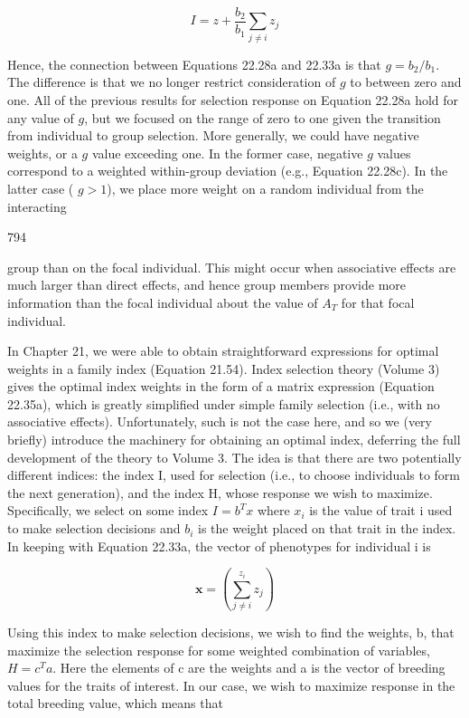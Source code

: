 \documentclass{article}
\begin{document}
\begin{equation}
I=z+\frac{b_{2}}{b_{1}}\sum_{j\neq i}z_{j}
\tag{22.33b}
\label{eq:22_33b}
\end{equation}

Hence, the connection between Equations 22.28a and 22.33a is that  $ g = b_2/b_1 $. The difference is that we no longer restrict consideration of  $ g $ to between zero and one. All of the previous results for selection response on Equation 22.28a hold for any value of  $ g $, but we focused on the range of zero to one given the transition from individual to group selection. More generally, we could have negative weights, or a  $ g $ value exceeding one. In the former case, negative  $ g $ values correspond to a weighted within-group deviation (e.g., Equation 22.28c). In the latter case ( $ g > 1 $), we place more weight on a random individual from the interacting

794

group than on the focal individual. This might occur when associative effects are much larger than direct effects, and hence group members provide more information than the focal individual about the value of  $ A_{T} $ for that focal individual.

In Chapter 21, we were able to obtain straightforward expressions for optimal weights in a family index (Equation 21.54). Index selection theory (Volume 3) gives the optimal index weights in the form of a matrix expression (Equation 22.35a), which is greatly simplified under simple family selection (i.e., with no associative effects). Unfortunately, such is not the case here, and so we (very briefly) introduce the machinery for obtaining an optimal index, deferring the full development of the theory to Volume 3. The idea is that there are two potentially different indices: the index I, used for selection (i.e., to choose individuals to form the next generation), and the index H, whose response we wish to maximize. Specifically, we select on some index  $ I = b^T x $ where  $ x_i $ is the value of trait i used to make selection decisions and  $ b_i $ is the weight placed on that trait in the index. In keeping with Equation 22.33a, the vector of phenotypes for individual i is

\begin{equation}
\mathbf{x}=\left(\sum_{j\neq i}^{z_{i}}z_{j}\right)
\tag{22.34a}
\label{eq:22_34a}
\end{equation}

Using this index to make selection decisions, we wish to find the weights, b, that maximize the selection response for some weighted combination of variables,  $ H = c^T a $. Here the elements of c are the weights and a is the vector of breeding values for the traits of interest. In our case, we wish to maximize response in the total breeding value, which means that
\end{document}
